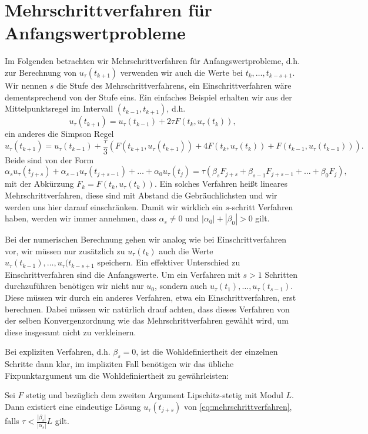 \section{Mehrschrittverfahren für Anfangswertprobleme}
%
Im Folgenden betrachten wir Mehrschrittverfahren für Anfangswertprobleme, d.h. zur Berechnung von $u_\tau(t_{k+1})$ verwenden wir auch die Werte bei $t_k, \ldots, t_{k-s+1}$. Wir nennen $s$ die Stufe des Mehrschrittverfahrens, ein Einschrittverfahren wäre dementsprechend von der Stufe eins. Ein einfaches Beispiel erhalten wir aus der Mittelpunktsregel im Intervall $(t_{k-1},t_{k+1})$, d.h.
$$ u_{\tau}(t_{k+1}) = u_\tau(t_{k-1}) + 2 \tau   F(t_k,u_\tau(t_k))  , $$
ein anderes die Simpson Regel
$$ u_{\tau}(t_{k+1}) = u_\tau(t_{k-1}) + \frac{\tau}3 ( F(t_{k+1},u_\tau(t_{k+1}))+ 4 F(t_k,u_\tau(t_k)) + F(t_{k-1},u_\tau(t_{k-1}))).$$
Beide sind von der Form
\begin{equation} \label{eq:mehrschrittverfahren}
\alpha_s u_\tau(t_{j+s}) + \alpha_{s-1} u_\tau(t_{j+s-1})+\ldots+\alpha_0 u_\tau(t_j) = \tau (\beta_s F_{j+s}  + \beta_{s-1}  F_{j+s-1}+\ldots+\beta_0 F_j ) ,
\end{equation} 
mit der Abkürzung $F_k = F(t_k,u_\tau(t_k))$. Ein solches Verfahren hei{\ss}t lineares Mehrschrittverfahren, diese sind mit Abstand die Gebräuchlichsten und wir werden uns hier darauf einschränken. Damit wir wirklich ein $s$-schritt Verfahren haben, werden wir immer annehmen, dass $\alpha_s \neq 0$ und $|\alpha_0|+|\beta_0|> 0$ gilt.

Bei der numerischen Berechnung gehen wir analog wie bei Einschrittverfahren vor, wir müssen nur zusätzlich zu $u_\tau(t_k)$ auch die Werte $u_\tau(t_{k-1}),\ldots,u_\tau(t_{k-s+1}$ speichern. Ein effektiver Unterschied zu Einschrittverfahren sind die Anfangswerte. Um ein Verfahren mit $s>1$ Schritten durchzuführen benötigen wir nicht nur $u_0$, sondern auch $u_\tau(t_1),\ldots,u_\tau(t_{s-1})$. Diese müssen wir durch ein anderes Verfahren, etwa ein Einschrittverfahren, erst berechnen. Dabei müssen wir natürlich drauf achten, dass dieses Verfahren von der selben Konvergenzordnung wie das Mehrschrittverfahren gewählt wird, um diese insgesamt nicht zu verkleinern. 

Bei expliziten Verfahren, d.h. $\beta_s = 0$, ist die Wohldefiniertheit der einzelnen Schritte dann klar, im impliziten Fall benötigen wir das übliche Fixpunktargument um die Wohldefiniertheit zu gewährleisten:
\begin{lemma}{}{}
Sei $F$ stetig und bezüglich dem zweiten Argument Lipschitz-stetig mit Modul $L$. Dann existiert eine eindeutige Lösung $u_\tau(t_{j+s})$ von \eqref{eq:mehrschrittverfahren}, falls $\tau < \frac{|\beta_s|}{|\alpha_s|}L$ gilt. 
\end{lemma} 

